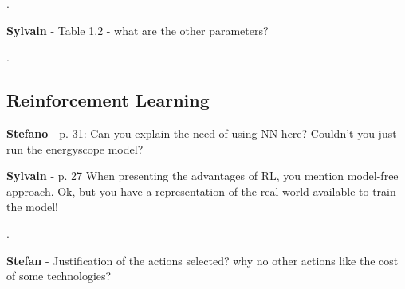 \documentclass[12pt,a4paper]{article}
\begin{document}
\noindent {\color{blue} }.

\begin{mdframed}[style=manuscript] %

\end{mdframed}

\begin{mdframed}[style=comment] %
{\color{purple} \textbf{Sylvain}} - Table 1.2 - what are the other parameters?
\end{mdframed}

\noindent {\color{blue} }.

\begin{mdframed}[style=manuscript] %

\end{mdframed}

\subsection{Reinforcement Learning}
\label{methodo_RL}

\begin{mdframed}[style=comment] %
{\color{orange} \textbf{Stefano}} - p. 31: Can you explain the need of using NN here? Couldn’t you just run the energyscope model?
\end{mdframed}

\noindent 

\begin{mdframed}[style=manuscript] %

\end{mdframed}

\begin{mdframed}[style=comment] %
{\color{purple} \textbf{Sylvain}} - p. 27 When presenting the advantages of RL, you mention model-free approach. Ok, but you have a representation of the real world available to train the model!
\end{mdframed}

\noindent {\color{blue} }.

\begin{mdframed}[style=manuscript] %

\end{mdframed}

\begin{mdframed}[style=comment] %
{\color{teal} \textbf{Stefan}} - Justification of the actions selected? why no other actions like the cost of some technologies? 
\end{mdframed}
\end{document}
